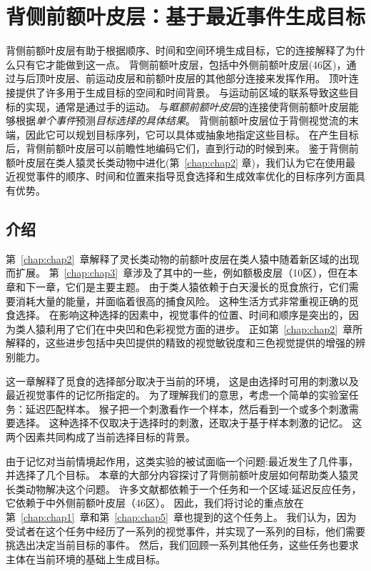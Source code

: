 \chapter{背侧前额叶皮层：基于最近事件生成目标} \label{chap:chap6}

背侧前额叶皮层有助于根据顺序、时间和空间环境生成目标，它的连接解释了为什么只有它才能做到这一点。
背侧前额叶皮层，包括中外侧前额叶皮层(46区)，通过与后顶叶皮层、前运动皮层和前额叶皮层的其他部分连接来发挥作用。
顶叶连接提供了许多用于生成目标的空间和时间背景。
与运动前区域的联系导致这些目标的实现，通常是通过手的运动。
与\textit{眶额前额叶皮层}的连接使背侧前额叶皮层能够根据\textit{单个事件}预测\textit{目标选择的具体结果}。
背侧前额叶皮层位于背侧视觉流的末端，因此它可以规划目标序列，它可以具体或抽象地指定这些目标。
在产生目标后，背侧前额叶皮层可以前瞻性地编码它们，直到行动的时候到来。
鉴于背侧前额叶皮层在类人猿灵长类动物中进化(第~\ref{chap:chap2} 章)，我们认为它在使用最近视觉事件的顺序、时间和位置来指导觅食选择和生成效率优化的目标序列方面具有优势。



\section{介绍}

第~\ref{chap:chap2}~章解释了灵长类动物的前额叶皮层在类人猿中随着新区域的出现而扩展。
第~\ref{chap:chap3}~章涉及了其中的一些，例如额极皮层（10区），但在本章和下一章，它们是主要主题。
由于类人猿依赖于白天漫长的觅食旅行，它们需要消耗大量的能量，并面临着很高的捕食风险。
这种生活方式非常重视正确的觅食选择。
在影响这种选择的因素中，视觉事件的位置、时间和顺序是突出的，因为类人猿利用了它们在中央凹和色彩视觉方面的进步。
正如第~\ref{chap:chap2}~章所解释的，这些进步包括中央凹提供的精致的视觉敏锐度和三色视觉提供的增强的辨别能力。


这一章解释了觅食的选择部分取决于当前的环境，
这是由选择时可用的刺激以及最近视觉事件的记忆所指定的。
为了理解我们的意思，考虑一个简单的实验室任务：延迟匹配样本。
猴子把一个刺激看作一个样本，然后看到一个或多个刺激需要选择。
这种选择不仅取决于选择时的刺激，还取决于基于样本刺激的记忆。
这两个因素共同构成了当前选择目标的背景。


由于记忆对当前情境起作用，这类实验的被试面临一个问题:最近发生了几件事，并选择了几个目标。
本章的大部分内容探讨了背侧前额叶皮层如何帮助类人猿灵长类动物解决这个问题。
许多文献都依赖于一个任务和一个区域:延迟反应任务，它依赖于中外侧前额叶皮层（46区）。
因此，我们将讨论的重点放在第~\ref{chap:chap1}~章和第~\ref{chap:chap5}~章也提到的这个任务上。
我们认为，因为受试者在这个任务中经历了一系列的视觉事件，并实现了一系列的目标，他们需要挑选出决定当前目标的事件。
然后，我们回顾一系列其他任务，这些任务也要求主体在当前环境的基础上生成目标。



